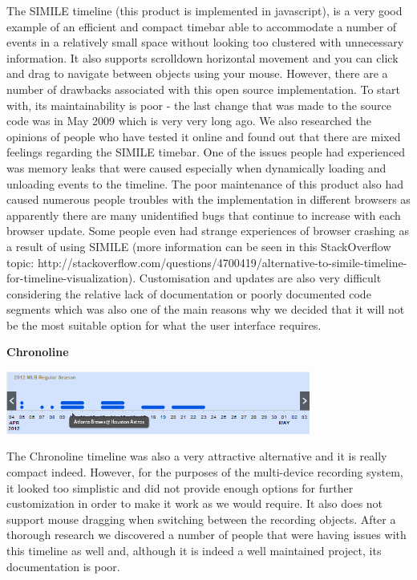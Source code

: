 \documentclass{l3proj}
\begin{document}
The SIMILE timeline (this product is implemented in javascript), is a very good example of an efficient and compact timebar able to accommodate a number of events in a relatively small space without looking too clustered with unnecessary information. It also supports scrolldown horizontal movement and  you can click and drag to navigate between objects using your mouse. However, there are a number of drawbacks associated with this open source implementation. To start with, its maintainability is poor - the last change that was made to the source code was in May 2009 which is very very long ago. We also researched the opinions of people who have tested it online and found out that there are mixed feelings regarding the SIMILE timebar. One of the issues people had experienced was memory leaks that were caused especially when dynamically loading and unloading events to the timeline. The poor maintenance of this product also had caused numerous people troubles with the implementation in different browsers as apparently there are many unidentified bugs that continue to increase with each browser update. Some people even had strange experiences of browser crashing as a result of using SIMILE (more information can be seen in this StackOverflow topic: http://stackoverflow.com/questions/4700419/alternative-to-simile-timeline-for-timeline-visualization). Customisation and updates are also very difficult considering the relative lack of documentation or poorly documented code segments which was also one of the main reasons why we decided that it will not be the most suitable option for what the user interface requires.


\textbf{Chronoline}

\includegraphics[width=0.75\textwidth]{images/Chronoline.png}

The Chronoline timeline was also a very attractive alternative and it is really compact indeed. However, for the purposes of the multi-device recording system, it looked too simplistic and did not provide enough options for further customization in order to make it work as we would require. It also does not support mouse dragging when switching between the recording objects. After a thorough research we discovered a number of people that were having issues with this timeline as well and, although it is indeed a well maintained project, its documentation is poor.
\end{document}
